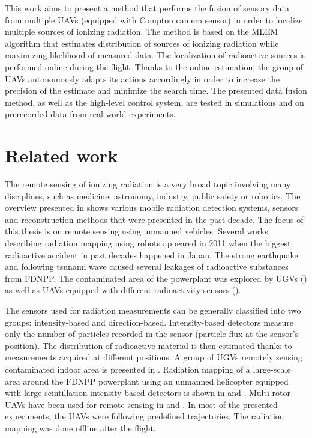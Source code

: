 This work aims to present a method that performs the fusion of sensory data from multiple \ac{UAV}s (equipped with Compton camera sensor) in order to localize multiple sources of ionizing radiation.
The method is based on the \ac{MLEM} algorithm that estimates distribution of sources of ionizing radiation while maximizing likelihood of measured data.
The localization of radioactive sources is performed online during the flight.
Thanks to the online estimation, the group of \ac{UAV}s autonomously adapts its actions accordingly  in order to increase the precision of the estimate and minimize the search time.
The presented data fusion method, as well as the high-level control system, are tested in simulations and on prerecorded data from real-world experiments.


\section{Related work}
The remote sensing of ionizing radiation is a very broad topic involving many disciplines, such as medicine, astronomy, industry, public safety or robotics.
The overview presented in \cite{radiation_detection_systems_overview} shows various mobile radiation detection systems, sensors and reconstruction methods that were presented in the past decade.
The focus of this thesis is on remote sensing using unmanned vehicles.
Several works describing radiation mapping using robots appeared in 2011 when the biggest radioactive accident in past decades happened in Japan.
The strong earthquake and following tsunami wave caused several leakages of radioactive substances from \ac{FDNPP}.
The contaminated area of the powerplant was explored by \ac{UGV}s (\cite{fuku2012,fuku_compton}) as well as \ac{UAV}s equipped with different radioactivity sensors (\cite{sanada2015, towler2012, Jiang2015, Mochizuki_2017, sato_drone_compton_camera_2018}).

The sensors used for radiation measurements can be generally classified into two groups: intensity-based and direction-based.
Intensity-based detectors measure only the number of particles recorded in the sensor (particle flux at the sensor's position).
The distribution of radioactive material is then estimated thanks to measurements acquired at different positions.
A group of \ac{UGV}s remotely sensing contaminated indoor area is presented in \cite{fuku2012}.
Radiation mapping of a large-scale area around the \ac{FDNPP} powerplant using an unmanned helicopter equipped with large scintillation intensity-based detectors is shown in \cite{sanada2015} and \cite{towler2012}.
Multi-rotor \ac{UAV}s have been used for remote sensing in \cite{nine_drone_fukushima, ten_remote_sensing_with_uderstanding_uav_ugv} and \cite{eleven_remote_sensing_non_japan}.
In most of the presented experiments, the \ac{UAV}s were following predefined trajectories.
The radiation mapping was done offline after the flight.

